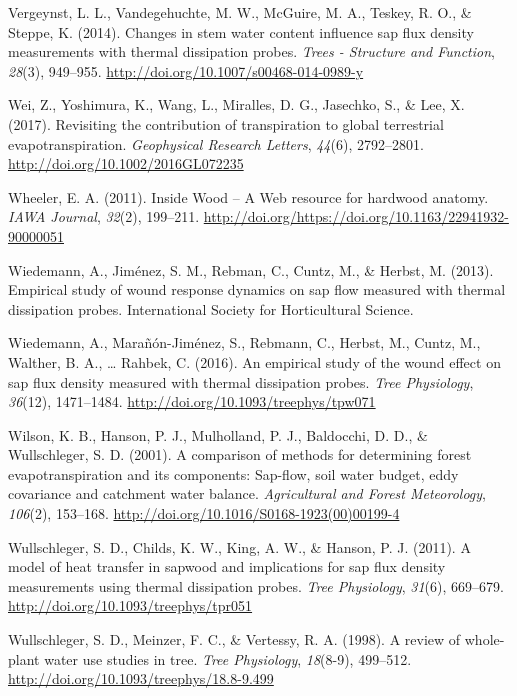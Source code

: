 \documentclass[11pt,twoside]{reedthesis}
\begin{document}
\hypertarget{ref-Vergeynst2014}{}
Vergeynst, L. L., Vandegehuchte, M. W., McGuire, M. A., Teskey, R. O.,
\& Steppe, K. (2014). Changes in stem water content influence sap flux
density measurements with thermal dissipation probes. \emph{Trees -
Structure and Function}, \emph{28}(3), 949--955.
\url{http://doi.org/10.1007/s00468-014-0989-y}

\hypertarget{ref-Wei2017}{}
Wei, Z., Yoshimura, K., Wang, L., Miralles, D. G., Jasechko, S., \& Lee,
X. (2017). Revisiting the contribution of transpiration to global
terrestrial evapotranspiration. \emph{Geophysical Research Letters},
\emph{44}(6), 2792--2801. \url{http://doi.org/10.1002/2016GL072235}

\hypertarget{ref-insidewood}{}
Wheeler, E. A. (2011). Inside Wood -- A Web resource for hardwood
anatomy. \emph{IAWA Journal}, \emph{32}(2), 199--211.
\url{http://doi.org/https://doi.org/10.1163/22941932-90000051}

\hypertarget{ref-Wiedemann2013}{}
Wiedemann, A., Jiménez, S. M., Rebman, C., Cuntz, M., \& Herbst, M.
(2013). Empirical study of wound response dynamics on sap flow measured
with thermal dissipation probes. International Society for Horticultural
Science.

\hypertarget{ref-Wiedemann2016}{}
Wiedemann, A., Marañón-Jiménez, S., Rebmann, C., Herbst, M., Cuntz, M.,
Walther, B. A., \ldots{} Rahbek, C. (2016). An empirical study of the
wound effect on sap flux density measured with thermal dissipation
probes. \emph{Tree Physiology}, \emph{36}(12), 1471--1484.
\url{http://doi.org/10.1093/treephys/tpw071}

\hypertarget{ref-Wilson2001}{}
Wilson, K. B., Hanson, P. J., Mulholland, P. J., Baldocchi, D. D., \&
Wullschleger, S. D. (2001). A comparison of methods for determining
forest evapotranspiration and its components: Sap-flow, soil water
budget, eddy covariance and catchment water balance. \emph{Agricultural
and Forest Meteorology}, \emph{106}(2), 153--168.
\url{http://doi.org/10.1016/S0168-1923(00)00199-4}

\hypertarget{ref-Wullschleger2011}{}
Wullschleger, S. D., Childs, K. W., King, A. W., \& Hanson, P. J.
(2011). A model of heat transfer in sapwood and implications for sap
flux density measurements using thermal dissipation probes. \emph{Tree
Physiology}, \emph{31}(6), 669--679.
\url{http://doi.org/10.1093/treephys/tpr051}

\hypertarget{ref-Wullschleger1998}{}
Wullschleger, S. D., Meinzer, F. C., \& Vertessy, R. A. (1998). A review
of whole-plant water use studies in tree. \emph{Tree Physiology},
\emph{18}(8-9), 499--512.
\url{http://doi.org/10.1093/treephys/18.8-9.499}
\end{document}
